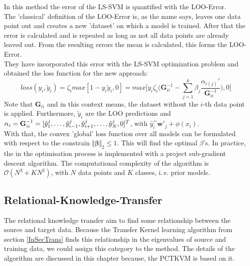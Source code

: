 In this method the error of the \acs{LS-SVM} is quantified with the \ac{LOO}-Error.\cite{Tommasi.}\\
The 'classical' definition of the \acs{LOO}-Error is, as the name says, leaves one data point out and creates a new 'dataset' on which a model is trained.
After that the error is calculated and is repeated as long as not all data points are already leaved out.
From the resulting errors the mean is calculated, this forms the \acl{LOO}-Error.\cite[p.74-76]{Evgeniou.2004}\\
They have incorporated this error with the \acs{LS-SVM} optimization problem and obtained the  loss function for the new approach:\cite{Tommasi.}
\begin{equation}
loss(y_i,\tilde{y}_i)= \zeta_i max[1-y_i\tilde{y}_i,0] = max \bigg[y_i\zeta_i\bigg({\mathbf{G}^{-1}_{ii}} - \sum_{j=1}^{k}\beta_j \frac{\alpha_{i(j)}'}{\mathbf{G}^{-1}_{ii}}\bigg),0\bigg]
\end{equation}
Note that $\mathbf{G}_{ii}$ and in this context means, the dataset without the $i$-th data point is applied.
Furthermore, $\tilde{y}_i$ are the \acs{LOO} predictions and $\alpha_i =\mathbf{G}_{ii}^{-1} = [\hat{y}_1^j,\dots,\hat{y}_{i-1}^j,\\\hat{y}_{i+1}^j,\dots,\hat{y}_N^j,0]^T$, with $\hat{y}_i^= \mathbf{w}'_j+\phi(x_i)$.\\
With that, the convex 'global' loss function over all models can be formulated with respect to the constrain $\Vert\boldsymbol{\beta}\Vert_2\le 1$.
This will find the optimal $\beta$'s.
In practice, the in the optimisation process is implemented with a project sub-gradient descent algorithm.\cite{Tommasi.}
The computational complexity of the algorithm is $\mathcal{O}(N^3+KN^2)$, with $N$ data points and $K$ classes, i.\,e. prior models.
\subsection{Relational-Knowledge-Transfer}\label{TlSubSecRelation}
The relational knowledge transfer aim to find some relationship between the source and target data.\cite[p. 7]{Weiss.2016}
Because the Transfer Kernel learning algorithm from section \ref{InSecTrans} finds this relationship in the eigenvalues of source and training data, we could assign this category to the method.
The details of the algorithm are discussed in this chapter because, the \acl{PCTKVM} is based on it.

